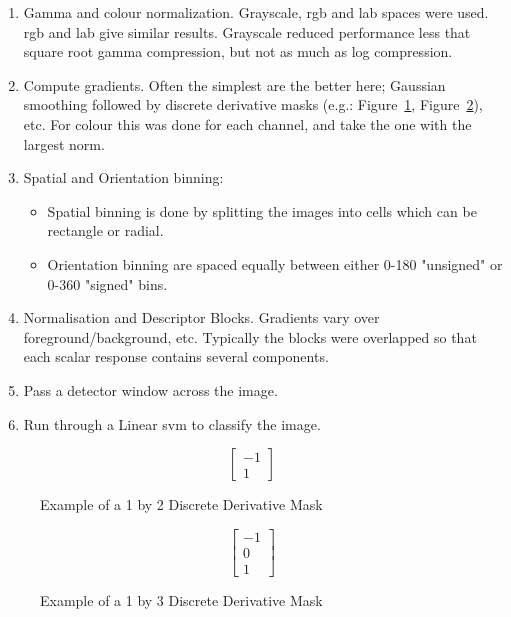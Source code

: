 \begin{enumerate}
\item Gamma and colour normalization. Grayscale, \gls{rgb} and \gls{lab} spaces were used.
\gls{rgb} and \gls{lab} give similar results. Grayscale reduced performance less that square root 
gamma compression, but not as much as log compression.

\item Compute gradients. Often the simplest are the better here; Gaussian smoothing followed by 
discrete derivative masks (e.g.: Figure~\ref{fig:1x2-ddm}, Figure~\ref{fig:1x3-ddm}), etc. For 
colour this was done for each channel, and take the one with the largest norm.

\item Spatial and Orientation binning:
\begin{itemize}
\item Spatial binning is done by splitting the images into cells which can be rectangle or radial.
\item Orientation binning are spaced equally between either 0-180 "unsigned" or 0-360 "signed" 
bins.
\end{itemize}

\item Normalisation and Descriptor Blocks. Gradients vary over foreground/background, etc. 
Typically the blocks were overlapped so that each scalar response contains several components.

\item Pass a detector window across the image.

\item Run through a Linear \gls{svm} to classify the image.
\end{enumerate}

\begin{figure}[h]
$$
\begin{bmatrix}
-1 \\
1
\end{bmatrix}
$$
\caption{Example of a 1 by 2 Discrete Derivative Mask} \label{fig:1x2-ddm}
\end{figure}

\begin{figure}[h]
$$
\begin{bmatrix}
-1 \\
0 \\
1
\end{bmatrix}
$$
\caption{Example of a 1 by 3 Discrete Derivative Mask} \label{fig:1x3-ddm}
\end{figure}

